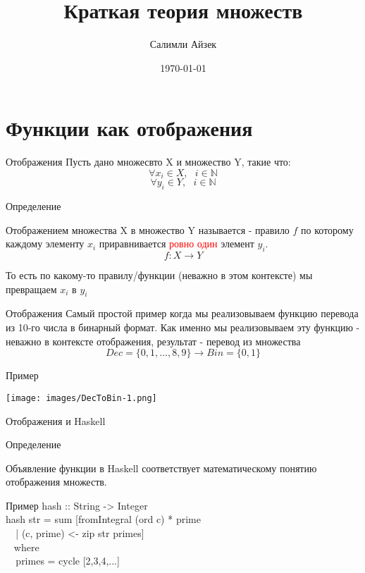 \documentclass{beamer}
\title[МОП]{Краткая теория множеств}
\author{Салимли Айзек}
\institute{MathLang}
\date{\today}
\newenvironment{rusdefinition}[1][Определение]{
    \begin{block}{#1}
}{\end{block}}
\newenvironment{rexample}[1][Пример]{\begin{exampleblock}{#1}}{\end{exampleblock}}
\begin{document}
\begin{frame}
    \titlepage
\end{frame}



\section{Функции как отображения}

\begin{frame}{Отображения}
    Пусть дано множесвто X и множество Y, такие что: 
    \[ \forall x_i \in X, \texttt{ } i \in \mathbb{N}\]
    \[ \forall y_i \in Y, \texttt{ } i \in \mathbb{N}\]
    \begin{rusdefinition}
        Отображением множества X в множество Y называется - правило $f$ по которому каждому элементу $x_i$ приравнивается \textcolor{red}{ровно один} элемент $y_i$.
        \[ f \colon X \rightarrow Y \]
    \end{rusdefinition}
    То есть по какому-то правилу/функции (неважно в этом контексте) мы превращаем $x_i$ в $y_i$
\end{frame}

\begin{frame}{Отображения}
    Самый простой пример когда мы реализовываем функцию перевода из 10-го числа в бинарный формат.
    Как именно мы реализовываем эту функцию - неважно в контексте отображения, результат - перевод из множества 
    \[ Dec = \{0, 1, \dots, 8, 9\} \rightarrow Bin = \{0, 1\}\]
    \begin{rexample}
    \begin{center}
        \texttt{[image: images/DecToBin-1.png]}
    \end{center}
    \end{rexample}
\end{frame}

\begin{frame}{Отображения и Haskell}
    \begin{rusdefinition}
        Объявление функции в Haskell соответствует математическому понятию отображения множеств.
    \end{rusdefinition}
    \begin{rexample}
hash :: String -> Integer\\
hash str = sum [fromIntegral (ord c) * prime \\
            \texttt{ }\texttt{ }| (c, prime) <- zip str primes] \\
            \texttt{ } where  \\
            \texttt{ }\texttt{ }primes = cycle [2,3,4,...]\\
    \end{rexample}
\end{frame}
\end{document}
